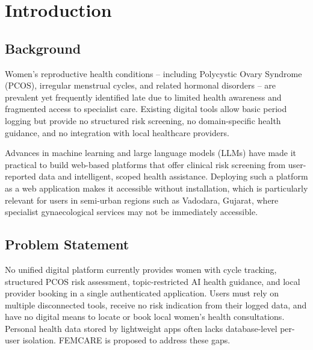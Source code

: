 
\chapter{Introduction}\doublespacing
\label{chap:introduction}

\section{Background}
\label{sec:background}

Women's reproductive health conditions -- including Polycystic Ovary Syndrome (PCOS), irregular menstrual cycles, and related hormonal disorders -- are prevalent yet frequently identified late due to limited health awareness and fragmented access to specialist care. Existing digital tools allow basic period logging but provide no structured risk screening, no domain-specific health guidance, and no integration with local healthcare providers. \cite{epstein2017}\cite{ahmed2023}

Advances in machine learning and large language models (LLMs) have made it practical to build web-based platforms that offer clinical risk screening from user-reported data and intelligent, scoped health assistance. \cite{zad2024}\cite{maity2025} Deploying such a platform as a web application makes it accessible without installation, which is particularly relevant for users in semi-urban regions such as Vadodara, Gujarat, where specialist gynaecological services may not be immediately accessible.

\section{Problem Statement}
\label{sec:problem}

No unified digital platform currently provides women with cycle tracking, structured PCOS risk assessment, topic-restricted AI health guidance, and local provider booking in a single authenticated application. \cite{epstein2017}\cite{kim2024} Users must rely on multiple disconnected tools, receive no risk indication from their logged data, and have no digital means to locate or book local women's health consultations. Personal health data stored by lightweight apps often lacks database-level per-user isolation. \cite{kotz2016} FEMCARE is proposed to address these gaps.

